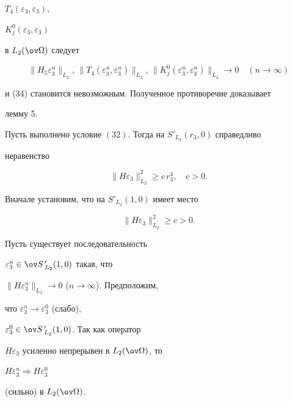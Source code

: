 $T_4(\varepsilon_3,\varepsilon_3)$, 


$K^0_j(\varepsilon_3,\varepsilon_3)$ 


в $L_2(\ov\Omega)$ следует 


$$ 


\|H_5\varepsilon^n_3\|_{L_2},\, 


\|T_4(\varepsilon^n_3,\varepsilon^n_3)\|_{L_2}, \, 


\|K^0_j(\varepsilon^n_3,\varepsilon^n_3)\|_{L_2} 


\longrightarrow 0\quad (n\to \infty) 


$$ 


и (34) становится невозможным. Полученное противоречие доказывает 


лемму 5. 


 


\begin{thm} 


Пусть выполнено условие $(32)$. Тогда на $S'_{L_2}(r_3,0)$ справедливо 


неравенство 


$$ 


\|H\varepsilon_3\|^2_{L_2}\ge c\,r^4_3,\quad c>0. 


$$ 


\end{thm} 


 


Вначале установим, что на $S'_{L_2}(1,0)$ имеет место 


\begin{equation} 


\|H\varepsilon_3\|^2_{L_2}\ge c>0. 


\end{equation} 


Пусть существует последовательность 


$\varepsilon^n_3\in\ov S\,{}'_{L_2}(1,0)$ такая, что 


$\|H\varepsilon^n_3\|_{L_2}\to 0$ ($n\to\infty$). Предположим, 


что $\varepsilon^n_3\to\varepsilon^0_3$ (слабо), 


$\varepsilon^0_3\in\ov S\,{}'_{L_2}(1,0)$. Так как оператор 


$H\varepsilon_3$ усиленно непрерывен в $L_2(\ov\Omega)$, то 


$H\varepsilon^n_3\Longrightarrow H\varepsilon^0_3$ 


(сильно) в $L_2(\ov\Omega)$. 


